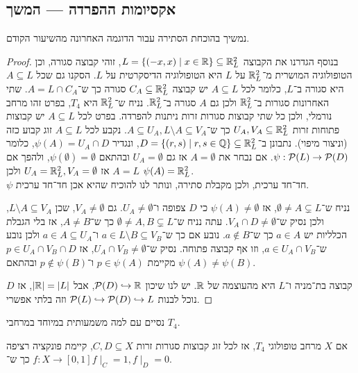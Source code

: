 \subsection{אקסיומות ההפרדה --- המשך}
נמשיך בהוכחת הסתירה עבור הדוגמה האחרונה מהשיעור הקודם.
\begin{proof}
	בנוסף הגדרנו את הקבוצה $L = \{ (-x, x) \mid x \in \mathbb{R} \} \subseteq \mathbb{R}_L^2$, זוהי קבוצה סגורה, וכן הטופולוגיה המושרית מ־$\mathbb{R}_L^2$ על $L$ היא הטופולוגיה הדיסקרטית על $L$.
	הסקנו גם שכל $A \subseteq L$ היא סגורה ב־$L$,
	כלומר לכל $A \subseteq L$ יש קבוצה $C_A \subseteq \mathbb{R}_L^2$ סגורה כך ש־$A = L \cap C_A$.
	שתי האחרונות סגורות ב־$\mathbb{R}_L^2$ ולכן גם $A$ סגורה ב־$\mathbb{R}_L^2$.
	נניח ש־$\mathbb{R}_L^2$ היא $T_4$, בפרט זהו מרחב נורמלי, ולכן כל שתי קבוצות סגורות זרות ניתנות להפרדה.
	בפרט לכל $A \subseteq L$ יש קבוצות פתוחות זרות $U_A, V_A \subseteq \mathbb{R}_L^2$ כך ש־$A \subseteq U_A, L \setminus A \subseteq V_A$.
	נקבע לכל $A \subseteq L$ זוג קבוע כזה (וניצור מיפוי).
	נתבונן ב־$D = \{ (r, s) \mid r, s \in \mathbb{Q} \} \subseteq \mathbb{R}_L^2$, ונגדיר $\psi(A) = U_A \cap D$, כלומר $\psi : \mathcal{P}(L) \to \mathcal{P}(D)$.
	אם נבחר את $A = \emptyset$ אז גם $U_A = \emptyset$ ובהתאם $\psi(\emptyset) = \emptyset$, ולהפך אם $A = L$ אז $U_A = \mathbb{R}_L^2, V_A = \emptyset$ ולכן $\psi(A) = \mathbb{R}_L^2$. \\
	$\psi$ חד־חד ערכית, ולכן מקבלת סתירה, ונותר לנו להוכיח שהיא אכן חד־חד ערכית.

	נניח ש־$\emptyset \ne A \subsetneq L$, אז $\psi(A) \ne \emptyset$ כי $D$ צפופה ו־$U_A \ne \emptyset$.
	גם $V_A \ne \emptyset$, שכן $L \setminus A \subseteq V_A$, ולכן נסיק ש־$V_A \cap D \ne \emptyset$.
	עתה נניח ש־$\emptyset \ne A, B \subsetneq L$ כך ש־$A \ne B$, אז בלי הגבלת הכלליות יש $a \in A$ כך ש־$a \notin B$.
	נובע אם כך ש־$a \in L \setminus B \subseteq V_B$ ו־$a \in A \subseteq U_A$ ולכן נובע ש־$a \in U_A \cap V_B$, וזו אף קבוצה פתוחה.
	נסיק ש־$U_A \cap V_B \ne \emptyset$, אז $p \in U_A \cap V_B \cap D$ מקיימת $p \in \psi(A)$ ו־$p \notin \psi(B)$ ובהתאם $\psi(A) \ne \psi(B)$.

	$D$ קבוצה בת־מניה ו־$L$ היא מהעוצמה של $\mathbb{R}$.
	יש לנו שיכון $\mathcal{P}(D) \hookrightarrow \mathbb{R}$, אבל $|\mathbb{R}| = |L|$, אז נוכל לבנות $\mathcal{P}(L) \hookrightarrow \mathcal{P}(D) \hookrightarrow L$ וזה בלתי אפשרי.
\end{proof}
נסיים עם למה משמעותית במיוחד במרחבי $T_4$.
\begin{lemma}
	אם $X$ מרחב טופולוגי $T_4$,
	אז לכל זוג קבוצות סגורות זרות $C, D \subseteq X$, קיימת פונקציה רציפה $f : X \to [0, 1]$ כך ש־$f \mid_C = 1, f \mid_D = 0$.
\end{lemma}
